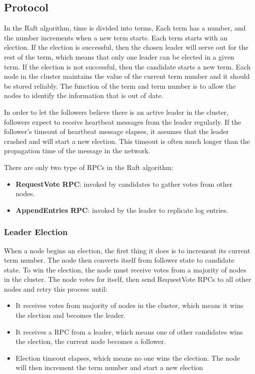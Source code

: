\documentclass[12pt, a4paper]{article}
\begin{document}
\subsection{Protocol}
In the Raft algorithm, time is divided into terms\cite{conf/usenix/OngaroO14}, Each term has a number, and the number increments when a new term starts. Each term starts with an election. If the election is successful, then the chosen leader will serve out for the rest of the term, which means that only one leader can be elected in a given term. If the election is not successful, then the candidate starts a new term. Each node in the cluster maintains the value of the current term number and it should be stored reliably. The function of the term and term number is to allow the nodes to identify the information that is out of date.

In order to let the followers believe there is an active leader in the cluster, followers expect to receive heartbeat messages from the leader regularly. If the follower's timeout of heartbeat message elapses, it assumes that the leader crashed and will start a new election. This timeout is often much longer than the propagation time of the message in the network.

There are only two type of RPCs in the Raft algorithm:
\begin{itemize}
  \item \textbf{RequestVote RPC}: invoked by candidates to gather votes\cite{conf/usenix/OngaroO14} from other nodes.
  \item \textbf{AppendEntries RPC}: invoked by the leader to replicate log entries\cite{conf/usenix/OngaroO14}.
\end{itemize}

  \subsubsection{Leader Election}
  When a node begins an election, the first thing it does is to increment its current term number. The node then converts itself from follower state to candidate state. To win the election, the node must receive votes from a majority of nodes in the cluster. The node votes for itself, then send RequestVote RPCs to all other nodes and retry this process until:
  \begin{itemize}
    \item It receives votes from majority of nodes in the cluster, which means it wins the election and becomes the leader.
    \item It receives a RPC from a leader, which means one of other candidates wins the election, the current node becomes a follower.
    \item Election timeout elapses, which means no one wins the election. The node will then increment the term number and start a new election
  \end{itemize}
\end{document}
